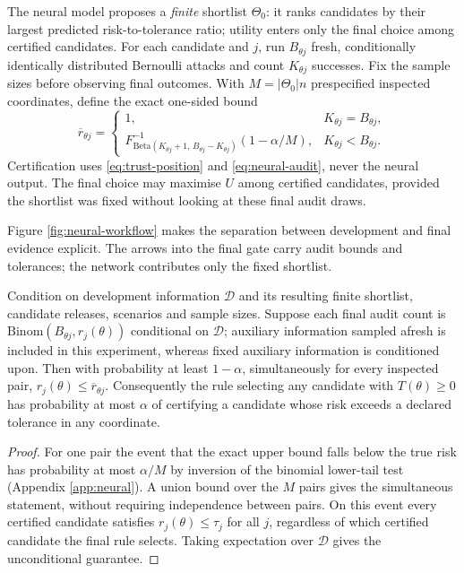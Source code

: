 The neural model proposes a \emph{finite} shortlist $\Theta_0$: it ranks
candidates by their largest predicted risk-to-tolerance ratio; utility enters
only the final choice among certified candidates. For each candidate and $j$, run $B_{\theta
j}$ fresh, conditionally identically distributed Bernoulli attacks and count
$K_{\theta j}$ successes. Fix the sample sizes before observing final outcomes.
With $M=|\Theta_0|n$ prespecified inspected coordinates,
define the exact one-sided bound
\begin{equation}
 \overline r_{\theta j}=
 \begin{cases}
 1,&K_{\theta j}=B_{\theta j},\\
 F^{-1}_{\mathrm{Beta}(K_{\theta j}+1,\,B_{\theta j}-K_{\theta j})}
      (1-\alpha/M),&K_{\theta j}<B_{\theta j}.
 \end{cases}\label{eq:neural-audit}
\end{equation}
Certification uses \eqref{eq:trust-position} and \eqref{eq:neural-audit}, never
the neural output. The final choice may maximise $U$ among certified candidates,
provided the shortlist was fixed without looking at these final audit draws.

Figure \ref{fig:neural-workflow} makes the separation between development
and final evidence explicit. The arrows into the final gate carry audit
bounds and tolerances; the network contributes only the fixed shortlist.


\begin{proposition}\label{prop:neural-gate}
Condition on development information $\mathcal D$ and its resulting finite
shortlist, candidate releases, scenarios and sample sizes. Suppose each final
audit count is $\mathrm{Binom}(B_{\theta j},r_j(\theta))$ conditional on
$\mathcal D$; auxiliary information sampled afresh is included in this
experiment, whereas fixed auxiliary information is conditioned upon. Then
with probability at
least $1-\alpha$, simultaneously for every inspected pair,
$r_j(\theta)\leq\overline r_{\theta j}$. Consequently the rule selecting any
candidate with $T(\theta)\geq0$ has probability at most $\alpha$ of certifying
a candidate whose risk exceeds a declared tolerance in any coordinate.
\end{proposition}
\begin{proof}
For one pair the event that the exact upper bound falls below the true risk
has probability at most $\alpha/M$ by inversion of the binomial lower-tail
test (Appendix \ref{app:neural}). A union bound over the $M$ pairs gives the
simultaneous statement, without requiring independence between pairs. On this
event every certified candidate satisfies $r_j(\theta)\leq\tau_j$ for all
$j$, regardless of which certified candidate the final rule selects.
Taking expectation over $\mathcal D$ gives the unconditional guarantee.
\end{proof}

